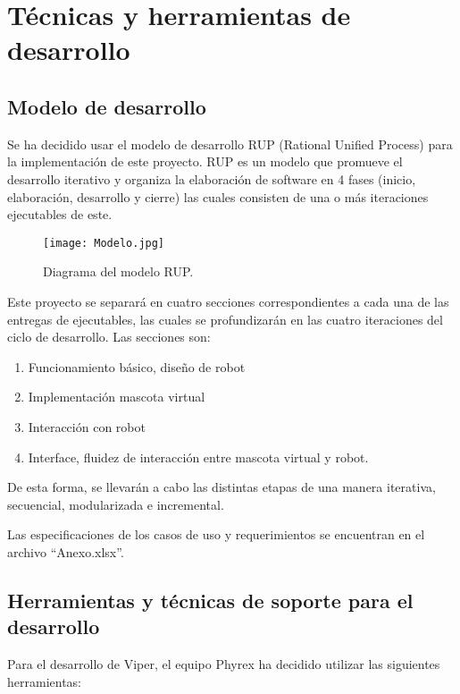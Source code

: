 \chapter{T\'ecnicas y herramientas de desarrollo}
\newpage

\section{Modelo de desarrollo}

Se ha decidido usar el modelo de desarrollo RUP (Rational Unified Process) para la implementaci\'on de este proyecto. RUP es un modelo que promueve el desarrollo iterativo y organiza la elaboraci\'on de software en 4 fases (inicio, elaboraci\'on, desarrollo y cierre) las cuales consisten de una o m\'as iteraciones ejecutables de este. 

\begin{figure}[H]
  \centering
  \texttt{[image: Modelo.jpg]}
  \caption[~RUP]{Diagrama del modelo RUP.}
  \label{fig:RUP}
\end{figure}

Este proyecto se separar\'a en cuatro secciones correspondientes a cada una de las entregas de ejecutables, las cuales se profundizar\'an en las cuatro iteraciones del ciclo de desarrollo. Las secciones son:

\begin{enumerate}
\item Funcionamiento b\'asico, dise\~no de robot
\item Implementaci\'on mascota virtual
\item Interacci\'on con robot
\item Interface, fluidez de interacci\'on entre mascota virtual y robot.
\end{enumerate}

De esta forma, se llevar\'an a cabo las distintas etapas de una manera iterativa, secuencial, modularizada e incremental.

Las especificaciones de los casos de uso y requerimientos se encuentran en el archivo ``Anexo.xlsx''.

\newpage
\section{Herramientas y t\'ecnicas de soporte para el de\-sa\-rro\-llo}

Para el desarrollo de Viper, el equipo Phyrex ha decidido utilizar las siguientes herramientas:

